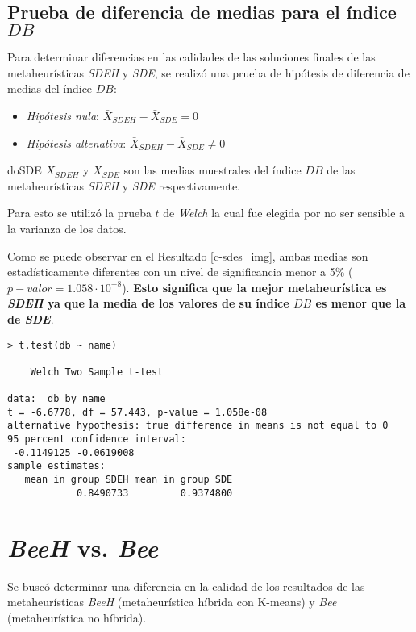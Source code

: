 \subsection{Prueba de diferencia de medias para el índice $DB$}

    Para determinar diferencias en las calidades de las soluciones finales de las
metaheurísticas \emph{SDEH} y \emph{SDE}, se realizó una prueba de hipótesis de
diferencia de medias del índice $DB$:
\begin{itemize}
    \item \emph{Hipótesis nula}: $\bar{X}_{SDEH} - \bar{X}_{SDE} = 0$
    \item \emph{Hipótesis altenativa}: $\bar{X}_{SDEH} - \bar{X}_{SDE} \neq 0$
\end{itemize}
doSDE $\bar{X}_{SDEH}$ y $\bar{X}_{SDE}$ son las medias muestrales del índice
$DB$ de las metaheurísticas \emph{SDEH} y \emph{SDE} respectivamente.

    Para esto se utilizó la prueba $t$ de \emph{Welch} \cite{AB_0} la cual fue
elegida por no ser sensible a la varianza de los datos.

	Como se puede observar en el Resultado \ref{c-sdes_img}, ambas medias son
estadísticamente diferentes con un nivel de significancia menor a 5\%
($p-valor = 1.058 \cdot 10^{-8}$). { \bf Esto significa que la mejor metaheurística
es \emph{SDEH} ya que la media de los valores de su índice $DB$ es menor que la
de \emph{SDE}}.

\begin{lstlisting}[float=h!, caption={Diferencia de Medias: Índice \emph{DB}}, label=c-sdes_img]
> t.test(db ~ name)

	Welch Two Sample t-test

data:  db by name 
t = -6.6778, df = 57.443, p-value = 1.058e-08
alternative hypothesis: true difference in means is not equal to 0 
95 percent confidence interval:
 -0.1149125 -0.0619008 
sample estimates:
   mean in group SDEH mean in group SDE
            0.8490733         0.9374800
\end{lstlisting}

\section{\emph{BeeH} vs. \emph{Bee}}

	Se buscó determinar una diferencia en la calidad de los resultados de las
metaheurísticas \emph{BeeH} (metaheurística híbrida con K-means) y
\emph{Bee} (metaheurística no híbrida).

